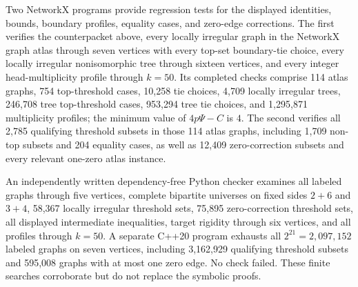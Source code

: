 \documentclass[a4paper,11pt]{amsart}
\numberwithin{equation}{section}
\theoremstyle{definition}
\theoremstyle{remark}
\begin{document}
Two NetworkX programs provide regression tests for the displayed identities, bounds, boundary profiles, equality cases, and zero-edge corrections.  The first verifies the counterpacket above, every locally irregular graph in the NetworkX graph atlas through seven vertices with every top-set boundary-tie choice, every locally irregular nonisomorphic tree through sixteen vertices, and every integer head-multiplicity profile through $k=50$.  Its completed checks comprise 114 atlas graphs, 754 top-threshold cases, 10,258 tie choices, 4,709 locally irregular trees, 246,708 tree top-threshold cases, 953,294 tree tie choices, and 1,295,871 multiplicity profiles; the minimum value of $4p\Psi-C$ is $4$.  The second verifies all 2,785 qualifying threshold subsets in those 114 atlas graphs, including 1,709 non-top subsets and 204 equality cases, as well as 12,409 zero-correction subsets and every relevant one-zero atlas instance.

An independently written dependency-free Python checker examines all labeled graphs through five vertices, complete bipartite universes on fixed sides $2+6$ and $3+4$, 58,367 locally irregular threshold sets, 75,895 zero-correction threshold sets, all displayed intermediate inequalities, target rigidity through six vertices, and all profiles through $k=50$.  A separate C++20 program exhausts all $2^{21}=2,097,152$ labeled graphs on seven vertices, including 3,162,929 qualifying threshold subsets and 595,008 graphs with at most one zero edge.  No check failed.  These finite searches corroborate but do not replace the symbolic proofs.



\end{document}
